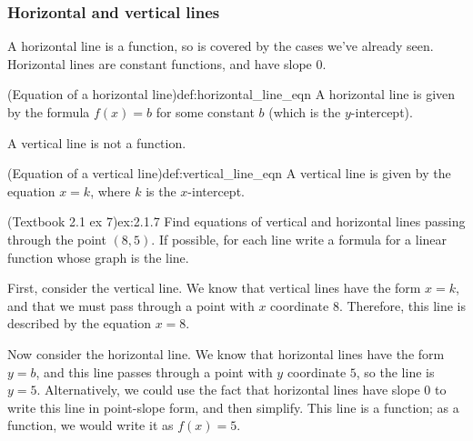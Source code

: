 \documentclass{article}
\begin{document}
\subsubsection{Horizontal and vertical lines}

A horizontal line is a function, so is covered by the cases we've already seen. Horizontal lines are constant functions, and have slope 0.
\begin{definition}{(Equation of a horizontal line)}{def:horizontal_line_eqn}
    A horizontal line is given by the formula $f(x)=b$ for some constant $b$ (which is the $y$-intercept).
\end{definition}

A vertical line is not a function.
\begin{definition}{(Equation of a vertical line)}{def:vertical_line_eqn}
    A vertical line is given by the equation $x=k$, where $k$ is the $x$-intercept.
\end{definition}

\begin{example}{(Textbook 2.1 ex 7)}{ex:2.1.7}
    Find equations of vertical and horizontal lines passing through the point $(8,5)$. If possible, for each line write a formula for a linear function whose graph is the line.
\end{example}
\begin{solution}
    First, consider the vertical line. We know that vertical lines have the form $x=k$, and that we must pass through a point with $x$ coordinate $8$. Therefore, this line is described by the equation $x=8$.

    Now consider the horizontal line. We know that horizontal lines have the form $y=b$, and this line passes through a point with $y$ coordinate $5$, so the line is $y=5$. Alternatively, we could use the fact that horizontal lines have slope 0 to write this line in point-slope form, and then simplify. This line is a function; as a function, we would write it as $f(x)=5$.

    \begin{center}
    \end{center}
\end{solution}
\end{document}
